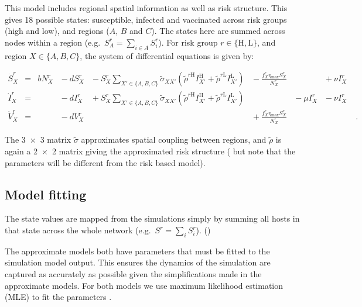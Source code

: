 This model includes regional spatial information as well as risk structure. This gives 18 possible states: susceptible, infected and vaccinated across risk groups (high and low), and regions ($A$, $B$ and $C$). The states here are summed across nodes within a region (e.g.\ $S^r_A = \sum_{i\in{}A}S^r_i$). For risk group $r\in{}\{\mathrm{H,L}\}$, and region $X\in{}\{A,B,C\}$, the system of differential equations is given by:
\begin{linenomath*}
    \begin{equation}
        \begin{alignedat}{7}
            \dot{S}^r_X &={} &bN^r_X &{}-{} dS^r_X &{}-{} S^r_X\sum_{X'\in\{A,B,C\}}\tilde{\sigma}_{XX'}\left(\tilde{\rho}^{r\mathrm{H}}I^{\mathrm{H}}_{X'} + \tilde{\rho}^{r\mathrm{L}}I^{\mathrm{L}}_{X'}\right) &{}-{} \frac{f^r_X\eta{}_\mathrm{max}S^r_X}{N^r_X} &&{}+{} \nu{}I^r_X \\
            \dot{I}^r_X &={}  &&{}-{} dI^r_X &{}+{} S^r_X\sum_{X'\in\{A,B,C\}}\tilde{\sigma}_{XX'}\left(\tilde{\rho}^{r\mathrm{H}}I^{\mathrm{H}}_{X'} + \tilde{\rho}^{r\mathrm{L}}I^{\mathrm{L}}_{X'}\right)& &{}-{} \mu{}I^r_X &{}-{} \nu{}I^r_X \\
            \dot{V}^r_X &={}  &&{}-{} dV^r_X &&{}+{} \frac{f^r_X\eta{}_\mathrm{max}S^r_X}{N^r_X}&&&\;.
        \end{alignedat}
        \label{eq:space_model}
    \end{equation}
\end{linenomath*}
The \num{3x3} matrix $\tilde{\sigma}$ approximates spatial coupling between regions, and $\tilde{\rho}$ is again a \num{2x2} matrix giving the approximated risk structure ( but note that the parameters will be different from the risk based model).

\subsection{Model fitting\label{sec:ch4:model_fitting}}


The state values are mapped from the simulations simply by summing all hosts in that state across the whole network (e.g.\ $S^r = \sum_{i}S^r_i$). ()

The approximate models both have parameters that must be fitted to the simulation model output. This ensures the dynamics of the simulation are captured as accurately as possible given the simplifications made in the approximate models. For both models we use maximum likelihood estimation (MLE) to fit the parameters \citep{aldrich_ra_1997}.

